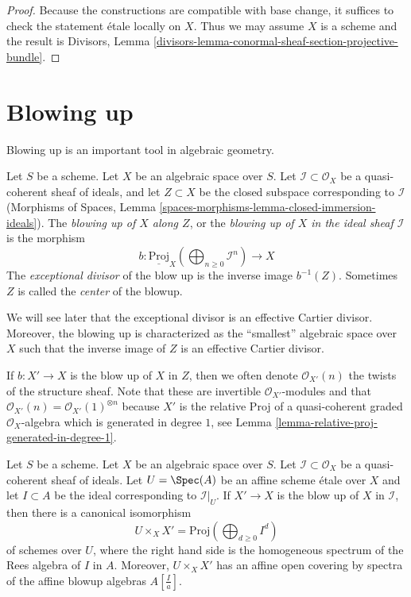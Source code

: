 \begin{proof}
Because the constructions are compatible with base change, it suffices to
check the statement \'etale locally on $X$. Thus we may assume $X$ is
a scheme and the result is
Divisors, Lemma \ref{divisors-lemma-conormal-sheaf-section-projective-bundle}.
\end{proof}






\section{Blowing up}
\label{section-blowing-up}

\noindent
Blowing up is an important tool in algebraic geometry.

\begin{definition}
\label{definition-blow-up}
Let $S$ be a scheme. Let $X$ be an algebraic space over $S$.
Let $\mathcal{I} \subset \mathcal{O}_X$ be a quasi-coherent sheaf
of ideals, and let $Z \subset X$ be the closed subspace corresponding
to $\mathcal{I}$
(Morphisms of Spaces, Lemma
\ref{spaces-morphisms-lemma-closed-immersion-ideals}).
The {\it blowing up of $X$ along $Z$}, or the
{\it blowing up of $X$ in the ideal sheaf $\mathcal{I}$} is
the morphism
$$
b :
\underline{\text{Proj}}_X
\left(\bigoplus\nolimits_{n \geq 0} \mathcal{I}^n\right)
\longrightarrow
X
$$
The {\it exceptional divisor} of the blow up is the inverse image
$b^{-1}(Z)$. Sometimes $Z$ is called the {\it center} of the blowup.
\end{definition}

\noindent
We will see later that the exceptional divisor is an effective Cartier
divisor. Moreover, the blowing up is characterized as the ``smallest''
algebraic space over $X$ such that the inverse image of $Z$ is an
effective Cartier divisor.

\medskip\noindent
If $b : X' \to X$ is the blow up of $X$ in $Z$, then we often denote
$\mathcal{O}_{X'}(n)$ the twists of the structure sheaf. Note that these
are invertible $\mathcal{O}_{X'}$-modules and that
$\mathcal{O}_{X'}(n) = \mathcal{O}_{X'}(1)^{\otimes n}$
because $X'$ is the relative Proj of a quasi-coherent graded
$\mathcal{O}_X$-algebra which is generated in degree $1$, see
Lemma \ref{lemma-relative-proj-generated-in-degree-1}.

\begin{lemma}
\label{lemma-blowing-up-affine}
Let $S$ be a scheme. Let $X$ be an algebraic space over $S$.
Let $\mathcal{I} \subset \mathcal{O}_X$ be a
quasi-coherent sheaf of ideals. Let $U = \Spec(A)$ be an affine scheme
\'etale over $X$ and let $I \subset A$ be the ideal corresponding to
$\mathcal{I}|_U$. If $X' \to X$ is the blow up of $X$ in $\mathcal{I}$,
then there is a canonical isomorphism
$$
U \times_X X' = \text{Proj}(\bigoplus\nolimits_{d \geq 0} I^d)
$$
of schemes over $U$, where the right hand side is
the homogeneous spectrum of the Rees algebra of $I$ in $A$.
Moreover, $U \times_X X'$ has an affine open covering by
spectra of the affine blowup algebras $A[\frac{I}{a}]$.
\end{lemma}

